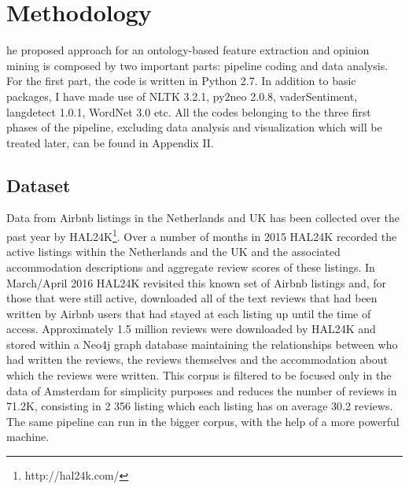 %
%
\let\textcircled=\pgftextcircled
\chapter{Methodology}
\label{chap:methods}
he proposed approach for an ontology-based feature extraction and opinion mining is composed by two important parts: pipeline coding and data analysis. For the first part, the code is written in Python 2.7. In addition to basic packages, I have made use of NLTK 3.2.1, py2neo 2.0.8, vaderSentiment, langdetect 1.0.1, WordNet 3.0 etc. All the codes belonging to the three first phases of the pipeline, excluding data analysis and visualization which will be treated later, can be found in Appendix II. 
\section{Dataset}
%
%

Data from Airbnb listings in the Netherlands and UK has been collected over the past year by HAL24K\footnote{http://hal24k.com/}. Over a number of months in 2015 HAL24K recorded the active listings within the Netherlands and the UK and the associated accommodation descriptions and aggregate review scores of these listings. In March/April 2016 HAL24K revisited this known set of Airbnb listings and, for those that were still active, downloaded all of the text reviews that had been written by Airbnb users that had stayed at each listing up until the time of access. Approximately 1.5 million reviews were downloaded by HAL24K and stored within a Neo4j graph database maintaining the relationships between who had written the reviews, the reviews themselves and the accommodation about which the reviews were written. This corpus is filtered to be focused only in the data of Amsterdam for simplicity purposes and reduces the number of reviews in 71.2K, consisting in 2 356 listing which each listing has on average 30.2 reviews. The same pipeline can run in the bigger corpus, with the help of a more powerful machine. 
%
%

